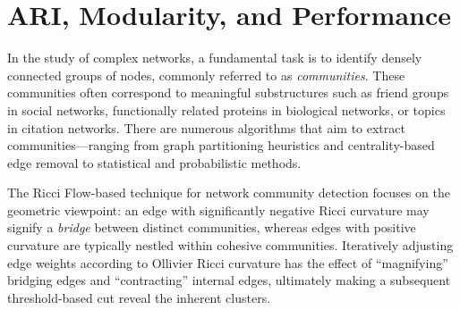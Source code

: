 \section{ARI, Modularity, and Performance}
\label{sec:ricci_flow_networks}

In the study of complex networks, a fundamental task is to identify densely connected groups of nodes, commonly referred to as \emph{communities}. These communities often correspond to meaningful substructures such as friend groups in social networks, functionally related proteins in biological networks, or topics in citation networks. There are numerous algorithms that aim to extract communities---ranging from graph partitioning heuristics and centrality-based edge removal to statistical and probabilistic methods.

The Ricci Flow-based technique for network community detection focuses on the geometric viewpoint: an edge with significantly negative Ricci curvature may signify a \emph{bridge} between distinct communities, whereas edges with positive curvature are typically nestled within cohesive communities. Iteratively adjusting edge weights according to Ollivier Ricci curvature has the effect of “magnifying” bridging edges and “contracting” internal edges, ultimately making a subsequent threshold-based cut reveal the inherent clusters.

